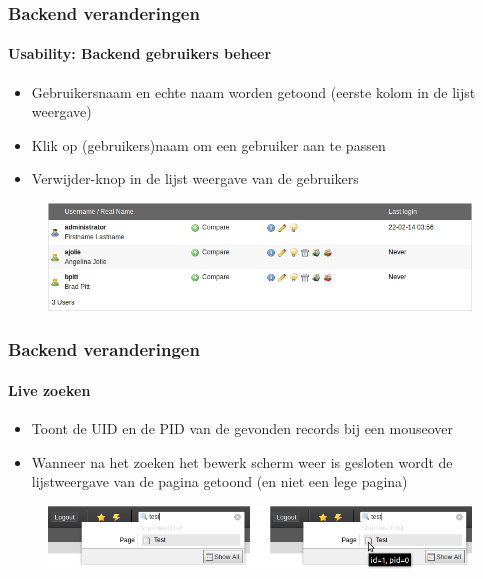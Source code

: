 
\begin{frame}[fragile]
	\frametitle{Backend veranderingen}
	\framesubtitle{Usability: Backend gebruikers beheer}

	\begin{itemize}
		\item Gebruikersnaam en echte naam worden getoond (eerste kolom in de lijst weergave)
		\item Klik op (gebruikers)naam om een gebruiker aan te passen 
		\item Verwijder-knop in de lijst weergave van de gebruikers

	\end{itemize}

	\begin{figure}
		\includegraphics[width=0.95\linewidth]{Images/BackendChanges/BackendUserList.png}
	\end{figure}

\end{frame}


\begin{frame}[fragile]
	\frametitle{Backend veranderingen}
	\framesubtitle{Live zoeken}

	\begin{itemize}
		\item Toont de UID en de PID van de gevonden records bij een mouseover
		\item Wanneer na het zoeken het bewerk scherm weer is gesloten wordt de lijstweergave van de pagina getoond (en niet een lege pagina)
	\end{itemize}

	\begin{figure}
		\includegraphics[width=0.8\linewidth]{Images/BackendChanges/LiveSearchTooltip.png}
	\end{figure}

\end{frame}


